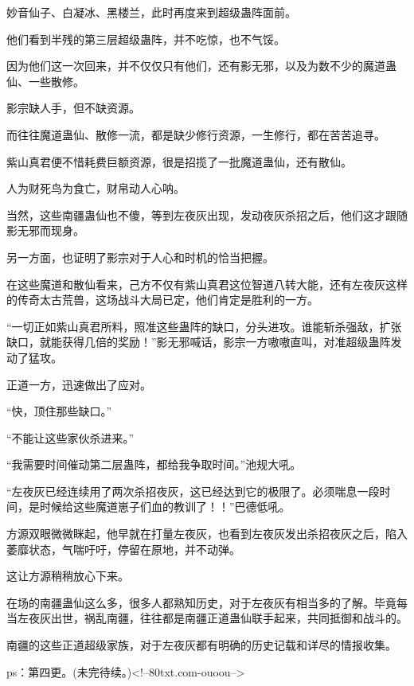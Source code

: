 \begin{this_body}
妙音仙子、白凝冰、黑楼兰，此时再度来到超级蛊阵面前。

他们看到半残的第三层超级蛊阵，并不吃惊，也不气馁。

因为他们这一次回来，并不仅仅只有他们，还有影无邪，以及为数不少的魔道蛊仙、一些散修。

影宗缺人手，但不缺资源。

而往往魔道蛊仙、散修一流，都是缺少修行资源，一生修行，都在苦苦追寻。

紫山真君便不惜耗费巨额资源，很是招揽了一批魔道蛊仙，还有散仙。

人为财死鸟为食亡，财帛动人心呐。

当然，这些南疆蛊仙也不傻，等到左夜灰出现，发动夜灰杀招之后，他们这才跟随影无邪而现身。

另一方面，也证明了影宗对于人心和时机的恰当把握。

在这些魔道和散仙看来，己方不仅有紫山真君这位智道八转大能，还有左夜灰这样的传奇太古荒兽，这场战斗大局已定，他们肯定是胜利的一方。

“一切正如紫山真君所料，照准这些蛊阵的缺口，分头进攻。谁能斩杀强敌，扩张缺口，就能获得几倍的奖励！”影无邪喊话，影宗一方嗷嗷直叫，对准超级蛊阵发动了猛攻。

正道一方，迅速做出了应对。

“快，顶住那些缺口。”

“不能让这些家伙杀进来。”

“我需要时间催动第二层蛊阵，都给我争取时间。”池规大吼。

“左夜灰已经连续用了两次杀招夜灰，这已经达到它的极限了。必须喘息一段时间，是时候给这些魔道崽子们血的教训了！！”巴德低吼。

方源双眼微微眯起，他早就在打量左夜灰，也看到左夜灰发出杀招夜灰之后，陷入萎靡状态，气喘吁吁，停留在原地，并不动弹。

这让方源稍稍放心下来。

在场的南疆蛊仙这么多，很多人都熟知历史，对于左夜灰有相当多的了解。毕竟每当左夜灰出世，祸乱南疆，往往都是南疆正道蛊仙联手起来，共同抵御和战斗的。

南疆的这些正道超级家族，对于左夜灰都有明确的历史记载和详尽的情报收集。

ps：第四更。(未完待续。)<!--80txt.com-ouoou-->

\end{this_body}

